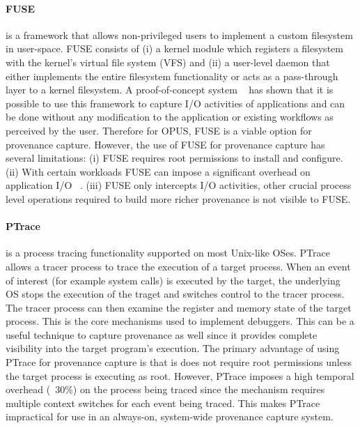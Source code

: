\documentclass[withindex,glossary]{cam-thesis}
\begin{document}
\paragraph{FUSE} is a framework that allows non-privileged users to implement a custom filesystem in user-space. FUSE consists of (i) a kernel module which registers a filesystem with the kernel's virtual file system (VFS) and (ii) a user-level daemon that either implements the entire filesystem functionality or acts as a pass-through layer to a kernel filesystem. A proof-of-concept system ~\cite{StoryBook} has shown that it is possible to use this framework to capture I/O activities of applications and can be done without any modification to the application or existing workflows as perceived by the user. Therefore for OPUS, FUSE is a viable option for provenance capture. However, the use of FUSE for provenance capture has several limitations:
(i) FUSE requires root permissions to install and configure.
(ii) With certain workloads FUSE can impose a significant overhead on application I/O ~\cite{StoryBook}.
(iii) FUSE only intercepts I/O activities, other crucial process level operations required to build more richer provenance is not visible to FUSE.

\paragraph{PTrace} is a process tracing functionality supported on most Unix-like OSes. 
PTrace allows a tracer process to trace the execution of a target process.
When an event of interest (for example system calls) is executed by the target, the underlying OS stops the execution of the traget and switches control to the tracer process.
The tracer process can then examine the register and memory state of the target process.
This is the core mechanisms used to implement debuggers.
This can be a useful technique to capture provenance as well since it provides complete visibility into the target program's execution.
The primary advantage of using PTrace for provenance capture is that is does not require root permissions unless the target process is executing as root.
However, PTrace imposes a high temporal overhead (~30\%) on the process being traced since the mechanism requires multiple context switches for each event being traced.
This makes PTrace impractical for use in an always-on, system-wide provenance capture system.

\end{document}
